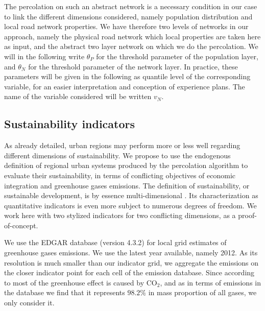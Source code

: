 \documentclass{jimis-en}
\begin{document}


The percolation on such an abstract network is a necessary condition in our case to link the different dimensions considered, namely population distribution and local road network properties. We have therefore two levels of networks in our approach, namely the physical road network which local properties are taken here as input, and the abstract two layer network on which we do the percolation. We will in the following write $\theta_P$ for the threshold parameter of the population layer, and $\theta_N$ for the threshold parameter of the network layer. In practice, these parameters will be given in the following as quantile level of the corresponding variable, for an easier interpretation and conception of experience plans. The name of the variable considered will be written $v_N$.


\subsection{Sustainability indicators}


As already detailed, urban regions may perform more or less well regarding different dimensions of sustainability. We propose to use the endogenous definition of regional urban systems produced by the percolation algorithm to evaluate their sustainability, in terms of conflicting objectives of economic integration and greenhouse gases emissions. The definition of sustainability, or sustainable development, is by essence multi-dimensional \citep{viguie2012trade}. Its characterization as quantitative indicators is even more subject to numerous degrees of freedom. We work here with two stylized indicators for two conflicting dimensions, as a proof-of-concept.


We use the EDGAR database \citep{janssens2017edgar} (version 4.3.2) for local grid estimates of greenhouse gases emissions. We use the latest year available, namely 2012. As its resolution is much smaller than our indicator grid, we aggregate the emissions on the closer indicator point for each cell of the emission database. Since according to \cite{lashof1990relative} most of the greenhouse effect is caused by $\textrm{CO}_2$, and as in terms of emissions in the database we find that it represents $98.2\%$ in mass proportion of all gases, we only consider it.
\end{document}
